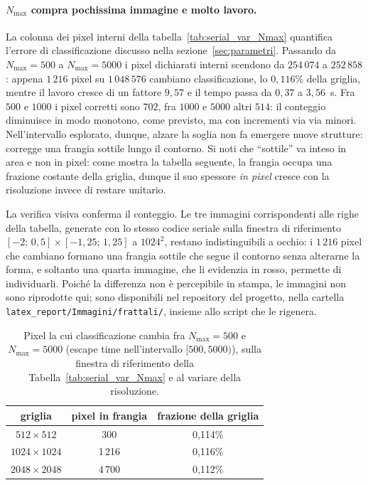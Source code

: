 \paragraph{$N_{\max}$ compra pochissima immagine e molto lavoro.}
La colonna dei pixel interni della tabella~\ref{tab:serial_var_Nmax} quantifica
l'errore di classificazione discusso nella sezione~\ref{sec:parametri}. Passando
da $N_{\max}=500$ a $N_{\max}=5000$ i pixel dichiarati interni scendono da
$254\,074$ a $252\,858$: appena $1\,216$ pixel su $1\,048\,576$ cambiano
classificazione, lo $0{,}116\%$ della griglia, mentre il lavoro cresce di un
fattore $9{,}57$ e il tempo passa da $0{,}37$ a $3{,}56$~s. Fra $500$ e $1000$ i
pixel corretti sono $702$, fra $1000$ e $5000$ altri $514$: il conteggio
diminuisce in modo monotono, come previsto, ma con incrementi via via minori.
Nell'intervallo esplorato, dunque, alzare la soglia non fa emergere nuove
strutture: corregge una frangia sottile lungo il contorno. Si noti che
``sottile'' va inteso in area e non in pixel: come mostra la tabella seguente,
la frangia occupa una frazione costante della griglia, dunque il suo spessore
\emph{in pixel} cresce con la risoluzione invece di restare unitario.

La verifica visiva conferma il conteggio. Le tre immagini corrispondenti alle
righe della tabella, generate con lo stesso codice seriale sulla finestra di
riferimento $[-2;\,0{,}5] \times [-1{,}25;\,1{,}25]$ a $1024^2$, restano
indistinguibili a occhio: i $1\,216$ pixel che cambiano formano una frangia
sottile che segue il contorno senza alterarne la forma, e soltanto una quarta
immagine, che li evidenzia in rosso, permette di individuarli. Poiché la
differenza non è percepibile in stampa, le immagini non sono riprodotte qui;
sono disponibili nel repository del progetto, nella cartella
\texttt{latex\_report/Immagini/frattali/}, insieme allo script che le rigenera.

\vspace{2,5mm}

\begin{table}[H]
    \centering
    \begin{tabular}{ccc}
        \hline
        \textbf{griglia} & \textbf{pixel in frangia} & \textbf{frazione della griglia}\\ \hline
        $512 \times 512$ & 300 & 0{,}114\% \\
        $1024 \times 1024$ & 1\,216 & 0{,}116\% \\
        $2048 \times 2048$ & 4\,700 & 0{,}112\% \\
    \end{tabular}
    \caption{Pixel la cui classificazione cambia fra $N_{\max}=500$ e
    $N_{\max}=5000$ (escape time nell'intervallo $[500, 5000)$), sulla
    finestra di riferimento della Tabella~\ref{tab:serial_var_Nmax} e al
    variare della risoluzione.}
    \label{tab:serial_frangia}
\end{table}

